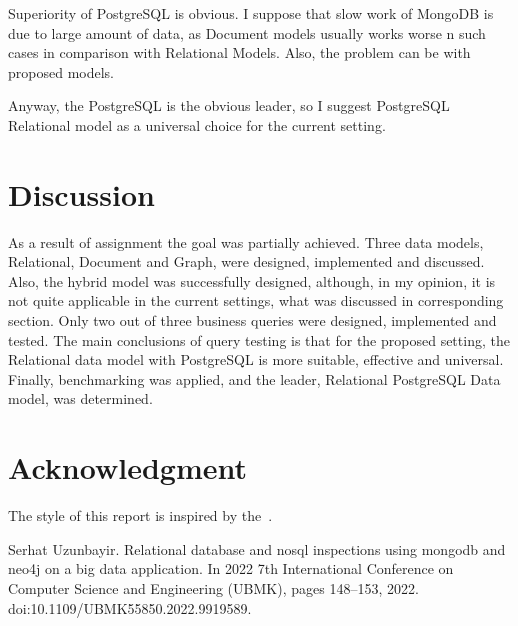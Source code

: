 \documentclass[conference]{IEEEtran}
\begin{document}
Superiority of PostgreSQL is obvious. I suppose that slow work of MongoDB is due to large amount of data, as Document models usually works worse n such cases in comparison with Relational Models. Also, the problem can be with proposed models.

Anyway, the PostgreSQL is the obvious leader, so I suggest PostgreSQL Relational model as a universal choice for the current setting.

\section{Discussion}
As a result of assignment the goal was partially achieved. Three data models, Relational, Document and Graph, were designed, implemented and discussed. Also, the hybrid model was successfully designed, although, in my opinion, it is not quite applicable in the current settings, what was discussed in corresponding section. Only two out of three business queries were designed, implemented and tested. The main conclusions of query testing is that for the proposed setting, the Relational data model with PostgreSQL is more suitable, effective and universal. Finally, benchmarking was applied, and the leader, Relational PostgreSQL Data model, was determined.


\section*{Acknowledgment}

The style of this report is inspired by the~\cite{uzunbayir}.


\begin{thebibliography}{00}
     Serhat Uzunbayir. Relational database and nosql inspections using mongodb and neo4j on a big data application.
    In 2022 7th International Conference on Computer Science and Engineering (UBMK), pages 148--153, 2022.
    doi:10.1109/UBMK55850.2022.9919589.
\end{thebibliography}
\end{document}
